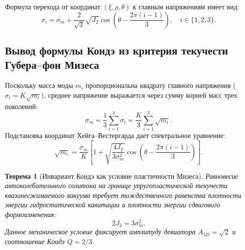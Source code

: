 \documentclass[11pt,a4paper]{article}
\newtheorem{theorem}{Теорема}[section]
\theoremstyle{definition}
\theoremstyle{remark}
\begin{document}
Формула перехода от координат $(\xi, \rho, \theta)$ к главным напряжениям имеет вид:
\begin{equation}
    \sigma_i = \sigma_m + \frac{2}{\sqrt{3}} \sqrt{J_2} \cos\left( \theta - \frac{2\pi(i-1)}{3} \right), \quad i \in \{1, 2, 3\}.
    \label{eq:sigma_hw}
\end{equation}

\subsection{Вывод формулы Коидэ из критерия текучести Губера--фон Мизеса}
Поскольку масса моды $m_i$ пропорциональна квадрату главного напряжения ($\sigma_i = K \sqrt{m_i}$), среднее напряжение выражается через сумму корней масс трех поколений:
\begin{equation}
    \sigma_m = \frac{1}{3} \sum_{i=1}^3 \sigma_i = \frac{K}{3} \sum_{i=1}^3 \sqrt{m_i}.
\end{equation}
Подстановка координат Хейга--Вестергарда дает спектральное уравнение:
\begin{equation}
    \sqrt{m_i} = \frac{\sigma_m}{K} \left[ 1 + \sqrt{\frac{4 J_2}{3 \sigma_m^2}} \cos\left( \theta - \frac{2\pi(i-1)}{3} \right) \right].
    \label{eq:koide_spectral}
\end{equation}

\begin{theorem}[Инвариант Коидэ как условие пластичности Мизеса]
Равновесие автоколебательного солитона на границе упругопластической текучести квазинесжимаемого вакуума требует тождественного равенства плотности энергии гидростатической кавитации и плотности энергии сдвигового формоизменения:
\begin{equation}
    2 J_2 = 3 \sigma_m^2.
    \label{eq:mises_balance}
\end{equation}
Данное механическое условие фиксирует амплитуду девиатора $A_{3D} = \sqrt{2}$ и соотношение Коидэ $Q = 2/3$.
\end{theorem}
\end{document}
